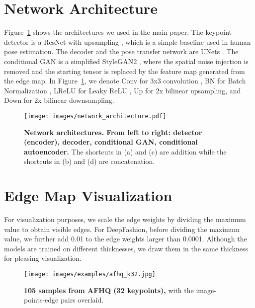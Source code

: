 \documentclass{article}
\begin{document}
\section{Network Architecture} \label{supp:archi}
Figure~\ref{fig:net_archi} shows the architectures we used in the main paper. 
The keypoint detector is a ResNet with upsampling \cite{xiao2018simple}, which is a simple baseline used in human pose estimation.
The decoder and the pose transfer network are UNets \cite{ronneberger2015u}.
The conditional GAN is a simplified StyleGAN2 \cite{karras2020analyzing}, where the spatial noise injection is removed and the starting tensor is replaced by the feature map generated from the edge map.
In Figure~\ref{fig:net_archi}, we denote Conv for 3x3 convolution \cite{lecun1989backpropagation}, BN for Batch Normalization \cite{ioffe2015batch}, LReLU for Leaky ReLU \cite{maas2013rectifier}, Up for 2x bilinear upsampling, and Down for 2x bilinear downsampling. 

\begin{figure}[t]
\begin{center}
  \texttt{[image: images/network\_architecture.pdf]}
\end{center}
    \caption{\textbf{Network architectures. From left to right: detector (encoder), decoder, conditional GAN, conditional autoencoder.}
    The shortcuts in (a) and (c) are addition while the shortcuts in (b) and (d) are concatenation.
}
\label{fig:net_archi}
\end{figure}

\section{Edge Map Visualization}
For visualization purposes, we scale the edge weights by dividing the maximum value to obtain visible edges. For DeepFashion, before dividing the maximum value, we further add 0.01 to the edge weights larger than 0.0001. Although the models are trained on different thicknesses, we draw them in the same thickness  for pleasing visualization.
 \begin{figure*}[t]
\begin{center}
   \texttt{[image: images/examples/afhq\_k32.jpg]}
\end{center}
   \caption{\textbf{105 samples from AFHQ (32 keypoints),} with the image-points-edge pairs overlaid.}
   \label{fig:gen_afhq_k32}
\end{figure*}
\end{document}
